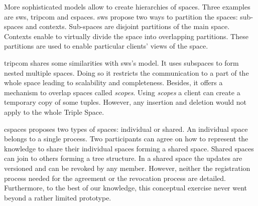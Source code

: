 More sophisticated models allow to create hierarchies of spaces.
Three examples are \ac{sws}, \ac{tripcom} \citep{simperl_coordination_2007} and \ac{cspaces}.
\ac{sws} \citep{tolksdorf_coordination_2006} propose two ways to partition the spaces: sub-spaces and contexts.
Sub-spaces are disjoint partitions of the main space.
Contexts enable to virtually divide the space into overlapping partitions.
These partitions are used to enable particular clients' views of the space.

\ac{tripcom} shares some similarities with \ac{sws}'s model.
It uses subspaces to form nested multiple spaces.
Doing so it restricts the communication to a part of the whole space leading to scalability and completeness. %
Besides, it offers a mechanism to overlap spaces called \emph{scopes}.
Using \emph{scopes} a client can create a temporary copy of some tuples.
However, any insertion and deletion would not apply to the whole Triple Space.

\ac{cspaces} \citep{martinrecuerda_towards_2005} proposes two types of spaces: individual or shared.
An individual space belongs to a single process.
Two participants can agree on how to represent the knowledge to share their individual spaces forming a shared space.
Shared spaces can join to others forming a tree structure.
In a shared space the updates are versioned and can be revoked by any member.
However, neither the registration process needed for the agreement or the revocation process are detailed.
Furthermore, to the best of our knowledge, this conceptual exercise never went beyond a rather limited prototype.






